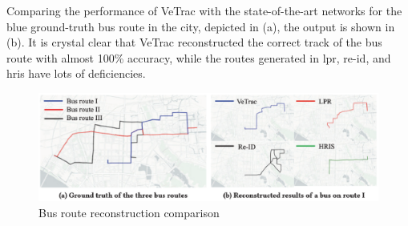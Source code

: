 Comparing the performance of VeTrac with the state-of-the-art networks for the blue ground-truth bus route in the city, depicted in (a), the output is shown in (b).
It is crystal clear that VeTrac reconstructed the correct track of the bus route with almost 100\% accuracy, while the routes generated in \ac{lpr}, \ac{re-id}, and \ac{hris} have lots of deficiencies.

\begin{figure}
\centering
  \includegraphics[width=0.9\linewidth]{figures/bus-route-reconstruction-comparison.eps}
  \caption{Bus route reconstruction comparison \cite{tong2021large}}
  \label{fig:bus-route-reconsturction-comparison}
\end{figure}
